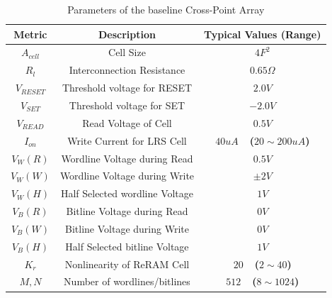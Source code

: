 \begin{table}[!b]
  \centering
  \scriptsize
    \scriptsize
  \caption{Parameters of the baseline Cross-Point Array}\label{table:parameter}
  \vspace{-5pt}
  \begin{tabular}{c|c|c}
    \hline    \hline
    \textbf{Metric} & \textbf{Description} & \textbf{Typical Values (Range)} \\
    \hline
    \textbf{$A_{cell}$} & Cell Size & \textbf{$4F^2$} \\
    \textbf{$R_l$} &  Interconnection Resistance&\textbf{$0.65\Omega$} \\
    \textbf{$V_{RESET}$} & Threshold voltage for RESET&\textbf{$2.0V$} \\
    \textbf{$V_{SET}$} & Threshold voltage for SET&\textbf{$-2.0V$} \\
    \textbf{$V_{READ}$} & Read Voltage of Cell&\textbf{$0.5V$} \\
    \textbf{$I_{on}$} & Write Current for LRS Cell &\textbf{$40uA$~~($20\sim200uA$)} \\
    \textbf{$V_{W}(R)$} & Wordline Voltage during Read &\textbf{$0.5V$} \\
    \textbf{$V_{W}(W)$} & Wordline Voltage during Write  &\textbf{$\pm2V$} \\
    \textbf{$V_{W}(H)$} & Half Selected wordline Voltage &\textbf{$1V$} \\
    \textbf{$V_{B}(R)$} & Bitline Voltage during Read  &\textbf{$0V$} \\
    \textbf{$V_{B}(W)$} & Bitline Voltage during Write  &\textbf{$0V$} \\
    \textbf{$V_{B}(H)$} & Half Selected bitline Voltage &\textbf{$1V$} \\
    \textbf{$K_r$} & Nonlinearity of ReRAM Cell &\textbf{$20$~~($2\sim40$)} \\
    \textbf{$M,N$} & Number of wordlines/bitlines &\textbf{$512$~~($8\sim1024$)} \\
    \hline
  \end{tabular}
  \vspace{-10pt}
\end{table}


